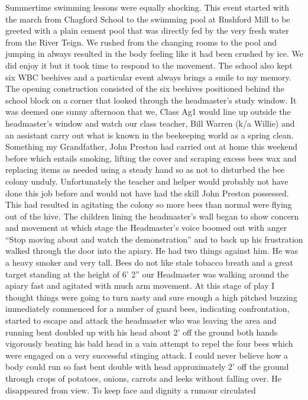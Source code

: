 Summertime swimming lessons were equally shocking. This event started with the
march from Chagford School to the swimming pool at Rushford Mill to be greeted
with a plain cement pool that was directly fed by the very fresh water from the
River Teign. We rushed from the changing rooms to the pool and jumping in
always resulted in the body feeling like it had been crushed by ice. We did
enjoy it but it took time to respond to the movement. The school also kept six
WBC beehives and a particular event always brings a smile to my memory. The
opening construction consisted of the six beehives positioned behind the school
block on a corner that looked through the headmaster's study window. It was
deemed one sunny afternoon that we, Class Ag1 would line up outside the
headmaster's window and watch our class teacher, Bill Warren (k/a Willie) and
an assistant carry out what is known in the beekeeping world as a spring clean.
Something my Grandfather, John Preston had carried out at home this weekend
before which entails smoking, lifting the cover and scraping excess bees wax
and replacing items as needed using a steady hand so as not to disturbed the
bee colony unduly. Unfortunately the teacher and helper would probably not
have done this job before and would not have had the skill John Preston
possessed. This had resulted in agitating the colony so more bees than normal
were flying out of the hive. The children lining the headmaster's wall began to
show concern and movement at which stage the Headmaster's voice boomed out with
anger ``Stop moving about and watch the demonstration'' and to back up his
frustration walked through the door into the apiary. He had two things against
him. He was a heavy smoker and very tall. Bees do not like stale tobacco
breath and a great target standing at the height of 6' 2'' our Headmaster was
walking around the apiary fast and agitated with much arm movement. At this
stage of play I thought things were going to turn nasty and sure enough a high
pitched buzzing immediately commenced for a number of guard bees, indicating
confrontation, started to escape and attack the headmaster who was leaving the
area and running bent doubled up with his head about 2' off the ground both
hands vigorously beating his bald head in a vain attempt to repel the four bees
which were engaged on a very successful stinging attack. I could never believe
how a body could run so fast bent double with head approximately 2' off the
ground through crops of potatoes, onions, carrots and leeks without falling
over. He disappeared from view. To keep face and dignity a rumour circulated
